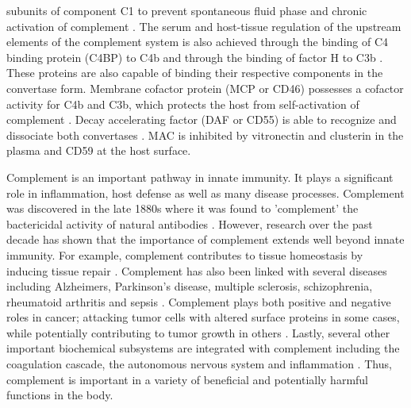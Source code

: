 \documentclass[12pt]{article}
\begin{document}
subunits of component C1 to prevent spontaneous fluid phase and chronic activation of complement \cite{walker1995complement}. The serum and host-tissue regulation of the upstream elements of the complement system is also achieved through the binding of C4 binding protein (C4BP) to C4b and through the binding of factor H to C3b \cite{blom2001structural}. These proteins are also capable of binding their respective components in the convertase form. Membrane cofactor protein (MCP or CD46) possesses a cofactor activity for C4b and C3b, which protects the host from self-activation of complement \cite{riley2004cd46}.  Decay accelerating factor (DAF or CD55) is able to recognize and dissociate both convertases \cite{lukacik2004complement}. MAC is inhibited by vitronectin and clusterin in the plasma and CD59 at the host surface.

Complement is an important pathway in innate immunity. It plays a significant role in inflammation, host defense as well as many disease processes.
Complement was discovered in the late 1880s where it was found to 'complement' the bactericidal activity of natural antibodies \cite{OG_COMPLEMENT_REF}.
However, research over the past decade has shown that the importance of complement extends well beyond innate immunity.
For example, complement contributes to tissue homeostasis by inducing tissue repair \cite{ricklin2010complement}.
Complement has also been linked with several diseases including Alzheimers, Parkinson's disease, multiple sclerosis, schizophrenia, rheumatoid arthritis and sepsis \cite{ricklin2007complement, rittirsch2008harmful}.
Complement plays both positive and negative roles in cancer; attacking tumor cells with altered surface proteins in some cases, while potentially contributing to tumor growth in others \cite{sarma2011complement, ricklin2013complement}.
Lastly, several other important biochemical subsystems are integrated with complement including the coagulation cascade, the autonomous nervous system and inflammation \cite{ricklin2013complement}.
Thus, complement is important in a variety of beneficial and potentially harmful functions in the body.
\end{document}
